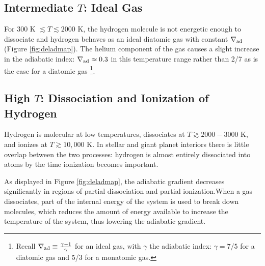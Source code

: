 \documentclass[apj]{emulateapj}
\newcommand{\delad}{\nabla_{\rm ad}}
\newcommand{\App}[1]{Appendix~\ref{#1}}
\begin{document}





\subsection{Intermediate $T$: Ideal Gas}

For $300$ K $\lesssim T \lesssim 2000$ K, the hydrogen molecule is not energetic enough to dissociate and hydrogen behaves as an ideal diatomic gas with constant $\delad$ (Figure \ref{fig:deladmap}). The helium component of the gas causes a slight increase in the adiabatic index: $\delad \approx 0.3$ in this temperature range rather than 2/7 as is the case for a diatomic gas \footnote{Recall $\delad \equiv \frac{\gamma-1}{\gamma}$ for an ideal gas, with $\gamma$ the adiabatic index: $\gamma=7/5$ for a diatomic gas and 5/3 for a monatomic gas.}.



\subsection{High $T$: Dissociation and Ionization of Hydrogen}

 Hydrogen is molecular at low temperatures, dissociates at $T \gtrsim 2000-3000$ K, and ionizes at  $T \gtrsim 10,000$ K. In stellar and giant planet interiors there is little overlap between the two processes: hydrogen is almost entirely dissociated into atoms by the time ionization becomes important. 

As displayed in Figure \ref{fig:deladmap}, the adiabatic gradient decreases significantly in regions of partial dissociation and partial ionization.When a gas dissociates, part of the internal energy of the system is used to break down molecules, which reduces the amount of energy available to increase the temperature of the system, thus lowering the adiabatic gradient. %
\end{document}
